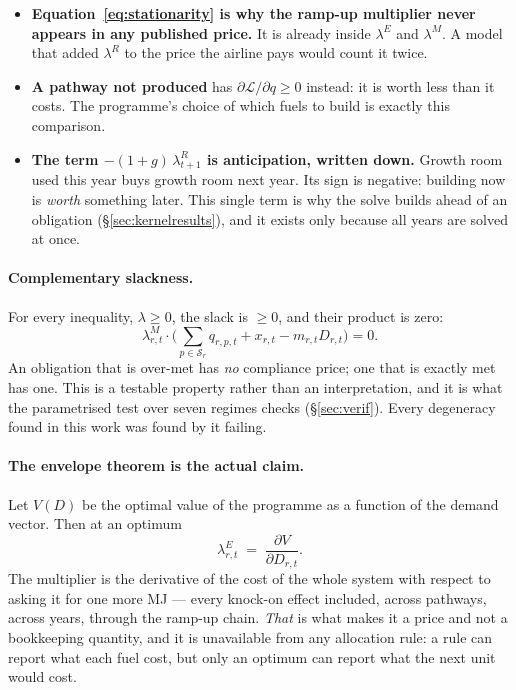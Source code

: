 \documentclass[11pt,a4paper]{article}
\begin{document}
\begin{itemize}[leftmargin=5mm,itemsep=1mm]
\item \textbf{Equation~\eqref{eq:stationarity} is why the ramp-up multiplier never
appears in any published price.} It is already inside $\lambda^{E}$ and $\lambda^{M}$. A
model that added $\lambda^{R}$ to the price the airline pays would count it twice.
\item \textbf{A pathway not produced} has $\partial\mathcal{L}/\partial q \ge 0$ instead:
it is worth less than it costs. The programme's choice of which fuels to build is
exactly this comparison.
\item \textbf{The term $-(1+g)\,\lambda^{R}_{t+1}$ is anticipation, written down.} Growth
room used this year buys growth room next year. Its sign is negative: building now is
\emph{worth} something later. This single term is why the solve builds ahead of an
obligation (\S\ref{sec:kernelresults}), and it exists only because all years are solved at
once.
\end{itemize}

\paragraph{Complementary slackness.} For every inequality, $\lambda \ge 0$, the slack is
$\ge 0$, and their product is zero:
\begin{equation}
\lambda^{M}_{r,t}\cdot\Big(\textstyle\sum_{p \in \mathcal{S}_r} q_{r,p,t} + x_{r,t} - m_{r,t}D_{r,t}\Big) = 0 .
\label{eq:cs}
\end{equation}
An obligation that is over-met has \emph{no} compliance price; one that is exactly met
has one. This is a testable property rather than an interpretation, and it is what the
parametrised test over seven regimes checks (\S\ref{sec:verif}). Every degeneracy
found in this work was found by it failing.

\paragraph{The envelope theorem is the actual claim.} Let $V(D)$ be the optimal value of
the programme as a function of the demand vector. Then at an optimum
\begin{equation}
\lambda^{E}_{r,t} \;=\; \frac{\partial V}{\partial D_{r,t}} .
\label{eq:envelope}
\end{equation}
The multiplier is the derivative of the cost of the whole system with respect to asking
it for one more MJ --- every knock-on effect included, across pathways, across years,
through the ramp-up chain. \emph{That} is what makes it a price and not a bookkeeping
quantity, and it is unavailable from any allocation rule: a rule can report what each
fuel cost, but only an optimum can report what the next unit would cost.
\end{document}
